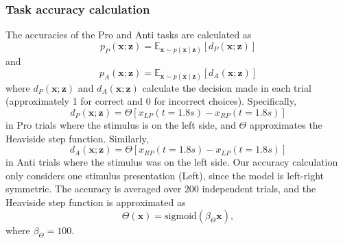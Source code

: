 \documentclass[11pt]{article}
\begin{document}
\subsubsection{Task accuracy calculation} \label{methods_sc_acc}
The accuracies of the Pro and Anti tasks are calculated as
\begin{equation}
p_P(\mathbf{x}; \mathbf{z}) = \mathbb{E}_{\mathbf{x} \sim p(\mathbf{x} \mid \mathbf{z})}\left[d_P(\mathbf{x}; \mathbf{z})\right]
\end{equation}
and 
\begin{equation}
p_A(\mathbf{x}; \mathbf{z}) = \mathbb{E}_{\mathbf{x}\sim p(\mathbf{x} \mid \mathbf{z})}\left[d_A(\mathbf{x}; \mathbf{z}) \right]
\end{equation}
where $d_P(\mathbf{x}; \mathbf{z})$ and $d_A(\mathbf{x}; \mathbf{z})$ calculate the decision made in each trial (approximately 1 for correct and 0 for incorrect choices).
Specifically, 
\begin{equation}
d_P(\mathbf{x}; \mathbf{z}) = \Theta[x_{LP}(t=1.8s) - x_{RP}(t=1.8s)]
\end{equation}
in Pro trials where the stimulus is on the left side, and $\Theta$ approximates the Heaviside step function.
Similarly, 
\begin{equation}
d_A(\mathbf{x}; \mathbf{z}) = \Theta[x_{RP}(t=1.8s) - x_{LP}(t=1.8s)]
\end{equation}
in Anti trials where the stimulus was on the left side.
Our accuracy calculation only considers one stimulus presentation (Left), since the model is left-right symmetric.
The accuracy is averaged over 200 independent trials, and the Heaviside step function is approximated as
\begin{equation}
\Theta(\mathbf{x}) = \text{sigmoid}(\beta_{\Theta} \mathbf{x}),
\end{equation}
where $\beta_{\Theta} = 100$.

\end{document}
